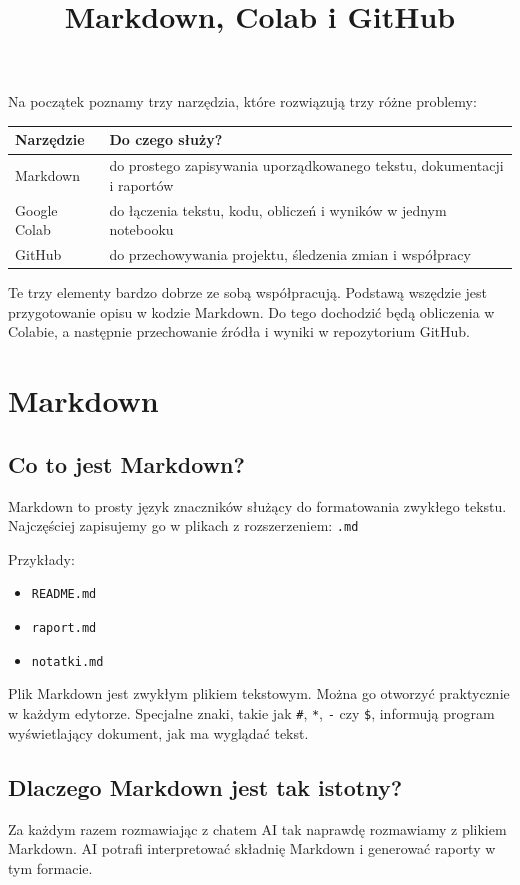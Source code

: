 \documentclass[12pt, a4paper]{article}
\title{Markdown, Colab i GitHub}
\author{}
\date{}
\begin{document}
\maketitle

Na początek poznamy trzy narzędzia, które rozwiązują trzy różne problemy:

\begin{table}[h]
\centering
\begin{tabular}{lp{10cm}}
\toprule
\textbf{Narzędzie} & \textbf{Do czego służy?} \\
\midrule
Markdown & do prostego zapisywania uporządkowanego tekstu, dokumentacji i raportów \\
Google Colab & do łączenia tekstu, kodu, obliczeń i wyników w jednym notebooku \\
GitHub & do przechowywania projektu, śledzenia zmian i współpracy \\
\bottomrule
\end{tabular}
\end{table}

Te trzy elementy bardzo dobrze ze sobą współpracują. Podstawą wszędzie jest przygotowanie opisu w kodzie Markdown. Do tego dochodzić będą obliczenia w Colabie, a następnie przechowanie źródła i wyniki w repozytorium GitHub.

\section{Markdown}

\subsection{Co to jest Markdown?}
Markdown to prosty język znaczników służący do formatowania zwykłego tekstu.
Najczęściej zapisujemy go w plikach z rozszerzeniem: \texttt{.md}

Przykłady:
\begin{itemize}
    \item \texttt{README.md}
    \item \texttt{raport.md}
    \item \texttt{notatki.md}
\end{itemize}

Plik Markdown jest zwykłym plikiem tekstowym. Można go otworzyć praktycznie w każdym edytorze. Specjalne znaki, takie jak \texttt{\#}, \texttt{*}, \texttt{-} czy \texttt{\$}, informują program wyświetlający dokument, jak ma wyglądać tekst.

\subsection{Dlaczego Markdown jest tak istotny?}
Za każdym razem rozmawiając z chatem AI tak naprawdę rozmawiamy z plikiem Markdown. AI potrafi interpretować składnię Markdown i generować raporty w tym formacie. 
\end{document}
